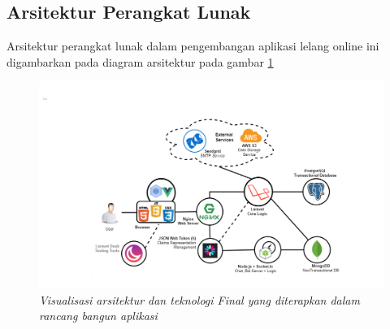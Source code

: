 
\subsection{Arsitektur Perangkat Lunak}
	\label{final-arch-tech}
	Arsitektur perangkat lunak dalam pengembangan aplikasi lelang online ini digambarkan pada diagram arsitektur pada gambar \ref{final-arch-tech-figure}
	\newpage
	
	\begin{landscape}
		\begin{figure}[H]
			\centering
			\includegraphics[height=.9\textheight]{images/bab3/arsitektur-app.png}
			\caption{\textit{Visualisasi arsitektur dan teknologi Final yang diterapkan dalam rancang bangun aplikasi}}
			\label{final-arch-tech-figure}
		\end{figure}
	\end{landscape}
	
	
